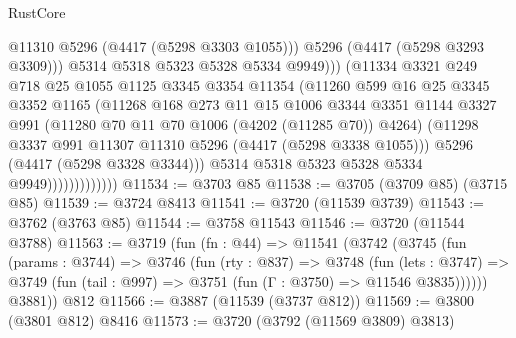 \begin{lexlean}{RustCore}
\begin{coremodule}
                                    @11310
                                    @5296
                                    (@4417 (@5298 @3303 @1055)))
                                  @5296
                                  (@4417 (@5298 @3293 @3309)))
                                @5314
                                @5318
                                @5323
                                @5328
                                @5334
                                @9949)))
                          (@11334
                            @3321
                            @249
                            @718
                            @25
                            @1055
                            @1125
                            @3345
                            @3354
                            @11354
                            (@11260
                              @599
                              @16
                              @25
                              @3345
                              @3352
                              @1165
                              (@11268
                                @168
                                @273
                                @11
                                @15
                                @1006
                                @3344
                                @3351
                                @1144
                                @3327
                                @991
                                (@11280 @70 @11 @70 @1006 (@4202 (@11285 @70)) @4264)
                                (@11298 @3337 @991 @11307 @11310 @5296 (@4417 (@5298 @3338 @1055)))
                                @5296
                                (@4417 (@5298 @3328 @3344)))
                              @5314
                              @5318
                              @5323
                              @5328
                              @5334
                              @9949)))))))))))))
@11534 := @3703 @85
@11538 := @3705 (@3709 @85) (@3715 @85)
@11539 := @3724 @8413
@11541 := @3720 (@11539 @3739)
@11543 := @3762 (@3763 @85)
@11544 := @3758 @11543
@11546 := @3720 (@11544 @3788)
@11563 := @3719
    (fun (fn : @44) =>
    @11541
      (@3742
        (@3745
          (fun (params : @3744) =>
          @3746
            (fun (rty : @837) =>
            @3748
              (fun (lets : @3747) =>
              @3749 (fun (tail : @997) => @3751 (fun (Γ : @3750) => @11546 @3835))))))
        @3881))
    @812
@11566 := @3887 (@11539 (@3737 @812))
@11569 := @3800 (@3801 @812) @8416
@11573 := @3720 (@3792 (@11569 @3809) @3813)

\end{coremodule}
\end{lexlean}
